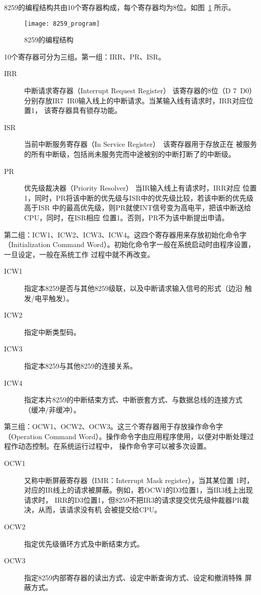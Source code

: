 8259的编程结构共由10个寄存器构成，每个寄存器均为8位。如图~\ref{fig:8259_program}
所示。

\begin{figure}[H]
	\centering
	\texttt{[image: 8259\_program]}
	\caption{8259的编程结构}
	\label{fig:8259_program}
\end{figure}

10个寄存器可分为三组。第一组：IRR、PR、ISR。

\begin{description}
	\item[IRR] 中断请求寄存器（Interrupt Request Register） 该寄存器的8位（D
	7~D0）分别存放IR7~IR0输入线上的中断请求。当某输入线有请求时，IRR对应位置1，
	该寄存器具有锁存功能。
	\item[ISR] 当前中断服务寄存器（In Service Register）　该寄存器用于存放正在
	被服务的所有中断级，包括尚未服务完而中途被别的中断打断了的中断级。
	\item[PR] 优先级裁决器（Priority Resolver） 当IR输入线上有请求时，IRR对应
	位置1，同时，PR将该中断的优先级与ISR中的优先级比较，若该中断的优先级高于ISR
	中的最高优先级，则PR就使INT信号变为高电平，把该中断送给CPU，同时，在ISR相应
	位置1。否则，PR不为该中断提出申请。
\end{description}

第二组：ICW1、ICW2、ICW3、ICW4。这四个寄存器用来存放初始化命令字（Initialization 
Command Word）。初始化命令字一般在系统启动时由程序设置，一旦设定，一般在系统工作
过程中就不再改变。

\begin{description}
	\item[ICW1] 指定本8259是否与其他8259级联，以及中断请求输入信号的形式（边沿
	触发/电平触发）。
	\item[ICW2] 指定中断类型码。
	\item[ICW3] 指定本8259与其他8259的连接关系。
	\item[ICW4] 指定本片8259的中断结束方式、中断嵌套方式、与数据总线的连接方式
	（缓冲/非缓冲）。
\end{description}

第三组：OCW1、OCW2、OCW3。这三个寄存器用于存放操作命令字（Operation Command 
Word）。操作命令字由应用程序使用，以便对中断处理过程作动态控制。在系统运行过程中，
操作命令字可以被多次设置。

\begin{description}
	\item[OCW1] 又称中断屏蔽寄存器（IMR：Interrupt Mask register），当其某位置
	1时，对应的IR线上的请求被屏蔽。例如，若OCW1的D3位置1，当IR3线上出现请求时，
	IRR的D3位置1，但8259不把IR3的请求提交优先级仲裁器PR裁决，从而，该请求没有机
	会被提交给CPU。
	\item[OCW2] 指定优先级循环方式及中断结束方式。
	\item[OCW3] 指定8259内部寄存器的读出方式、设定中断查询方式、设定和撤消特殊
	屏蔽方式。
\end{description}

